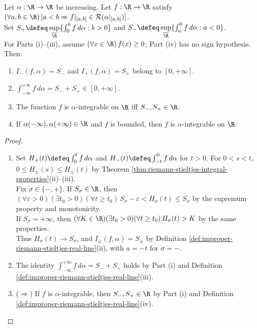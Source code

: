 \begin{theorem} \label{thm:improper-riemann-stieltjes-nonnegative-bounded-mass} \\
Let $\alpha:\R\to\R$ be increasing. Let $f:\R\to\R$ satisfy $(\forall a,b\in\R)\,[a<b\Rightarrow f|_{[a,b]}\in\mathcal{R}(\alpha|_{[a,b]})]$.\\
Set $S_+\defeq\sup\limits_{\overline{\R}}\{\int_0^b f\,d\alpha:b>0\}$ and $S_-\defeq\sup\limits_{\overline{\R}}\{\int_a^0 f\,d\alpha:a<0\}$.\\
For Parts (i)--(iii), assume $(\forall x\in\R)\,f(x)\geq0$; Part (iv) has no sign hypothesis. Then:
\begin{enumerate}[label=(\roman*)]
\setlength{\itemsep}{0pt}
\item $I_-(f,\alpha)=S_-$ and $I_+(f,\alpha)=S_+$ belong to $[0,+\infty]$.
\item $\int_{-\infty}^{+\infty}f\,d\alpha=S_-+S_+\in[0,+\infty]$.
\item The function $f$ is $\alpha$-integrable on $\R$ iff $S_-,S_+\in\R$.
\item If $\alpha(-\infty),\alpha(+\infty)\in\R$ and $f$ is bounded, then $f$ is $\alpha$-integrable on $\R$.
\end{enumerate}
\begin{proof}
\begin{enumerate}[label=(\roman*)]
\setlength{\itemsep}{0pt}
\item[$(i)$] Set $H_+(t)\defeq\int_0^t f\,d\alpha$ and $H_-(t)\defeq\int_{-t}^0 f\,d\alpha$ for $t>0$. For $0<s<t$, $0\leq H_\pm(s)\leq H_\pm(t)$ by Theorem \ref{thm:riemann-stieltjes-integral-properties}(ii)--(iii).\\
Fix $\sigma\in\{-,+\}$. If $S_\sigma\in\R$, then $(\forall\varepsilon>0)(\exists t_0>0)(\forall t\geq t_0)\,S_\sigma-\varepsilon<H_\sigma(t)\leq S_\sigma$ by the supremum property and monotonicity.\\
If $S_\sigma=+\infty$, then $(\forall K\in\R)(\exists t_0>0)(\forall t\geq t_0)\,H_\sigma(t)>K$ by the same properties.\\
Thus $H_\sigma(t)\to S_\sigma$, and $I_\pm(f,\alpha)=S_\pm$ by Definition \ref{def:improper-riemann-stieltjes-real-line}(ii), with $a=-t$ for $\sigma=-$.
\item[$(ii)$] The identity $\int_{-\infty}^{+\infty}f\,d\alpha=S_-+S_+$ holds by Part (i) and Definition \ref{def:improper-riemann-stieltjes-real-line}(iii).
\item[$(iii)$] ($\Rightarrow$) If $f$ is $\alpha$-integrable, then $S_-,S_+\in\R$ by Part (i) and Definition \ref{def:improper-riemann-stieltjes-real-line}(iv).

\end{enumerate}
\end{proof}
\end{theorem}
